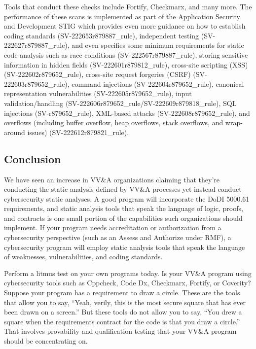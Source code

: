 Tools that conduct these checks include Fortify, Checkmarx, and many more. The performance of these scans is implemented as part of the Application Security and Development STIG\autocite{20230918:ASDStig} which provides even more guidance on how to establish coding standards (SV-222653r879887\_rule), independent testing (SV-222627r879887\_rule), and even specifies some minimum requirements for static code analysis such as race conditions (SV-222567r879887\_rule), storing sensitive information in hidden fields (SV-222601r879812\_rule), cross-site scripting (XSS) (SV-222602r879652\_rule), cross-site request forgeries (CSRF) (SV-222603r879652\_rule), command injections (SV-222604r879652\_rule), canonical representation vulnerabilities (SV-222605r879652\_rule), input validation/handling (SV-222606r879652\_rule/SV-222609r879818\_rule), SQL injections (SV-\-r879652\_\-rule), XML-based attacks (SV-222608r879652\_rule), and overflows (including buffer overflow, heap overflows, stack overflows, and wrap-around issues) (SV-222612r879821\_rule).

\subsection{Conclusion}

We have seen an increase in VV\&A organizations claiming that they're conducting the static analysis defined by VV\&A processes yet instead conduct cybersecurity static analyses. A good program will incorporate the DoDI 5000.61 requirements, and static analysis tools that speak the language of logic, proofs, and contracts is one small portion of the capabilities such organizations should implement. If your program needs accreditation or authorization from a cybersecurity perspective (such as an Assess and Authorize under RMF), a cybersecurity program will employ static analysis tools that speak the language of weaknesses, vulnerabilities, and coding standards.

Perform a litmus test on your own programs today. Is your VV\&A program using cybersecurity tools such as Cppcheck, Code Dx, Checkmarx, Fortify, or Coverity? Suppose your program has a requirement to draw a circle. These are the tools that allow you to say, ``Yeah, verily, this is the most secure square that has ever been drawn on a screen.'' But these tools do not allow you to say, ``You drew a square when the requirements contract for the code is that you draw a circle.'' That involves provability and qualification testing that your VV\&A program should be concentrating on.
